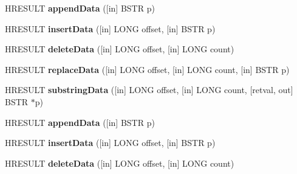 \begin{DoxyCompactItemize}
H\+R\+E\+S\+U\+LT {\bfseries append\+Data} (\mbox{[}in\mbox{]} B\+S\+TR p)
\item 
\mbox{\label{interface_m_s_x_m_l2_1_1_i_x_m_l_d_o_m_character_data_a5062b8f62739633567d3a8bc18777fc5}} 
H\+R\+E\+S\+U\+LT {\bfseries insert\+Data} (\mbox{[}in\mbox{]} L\+O\+NG offset, \mbox{[}in\mbox{]} B\+S\+TR p)
\item 
\mbox{\label{interface_m_s_x_m_l2_1_1_i_x_m_l_d_o_m_character_data_a4a125c94240e25ac8b3e01165ce791cc}} 
H\+R\+E\+S\+U\+LT {\bfseries delete\+Data} (\mbox{[}in\mbox{]} L\+O\+NG offset, \mbox{[}in\mbox{]} L\+O\+NG count)
\item 
\mbox{\label{interface_m_s_x_m_l2_1_1_i_x_m_l_d_o_m_character_data_a448f54e8e0951c31bdb157b3d0c267b5}} 
H\+R\+E\+S\+U\+LT {\bfseries replace\+Data} (\mbox{[}in\mbox{]} L\+O\+NG offset, \mbox{[}in\mbox{]} L\+O\+NG count, \mbox{[}in\mbox{]} B\+S\+TR p)
\item 
\mbox{\label{interface_m_s_x_m_l2_1_1_i_x_m_l_d_o_m_character_data_a74f8e5d73e36689dfc1e33f5459d0220}} 
H\+R\+E\+S\+U\+LT {\bfseries substring\+Data} (\mbox{[}in\mbox{]} L\+O\+NG offset, \mbox{[}in\mbox{]} L\+O\+NG count, \mbox{[}retval, out\mbox{]} B\+S\+TR $\ast$p)
\item 
\mbox{\label{interface_m_s_x_m_l2_1_1_i_x_m_l_d_o_m_character_data_af0c42e87b947f04f7d43529263c2a59f}} 
H\+R\+E\+S\+U\+LT {\bfseries append\+Data} (\mbox{[}in\mbox{]} B\+S\+TR p)
\item 
\mbox{\label{interface_m_s_x_m_l2_1_1_i_x_m_l_d_o_m_character_data_a5062b8f62739633567d3a8bc18777fc5}} 
H\+R\+E\+S\+U\+LT {\bfseries insert\+Data} (\mbox{[}in\mbox{]} L\+O\+NG offset, \mbox{[}in\mbox{]} B\+S\+TR p)
\item 
\mbox{\label{interface_m_s_x_m_l2_1_1_i_x_m_l_d_o_m_character_data_a4a125c94240e25ac8b3e01165ce791cc}} 
H\+R\+E\+S\+U\+LT {\bfseries delete\+Data} (\mbox{[}in\mbox{]} L\+O\+NG offset, \mbox{[}in\mbox{]} L\+O\+NG count)

\end{DoxyCompactItemize}
